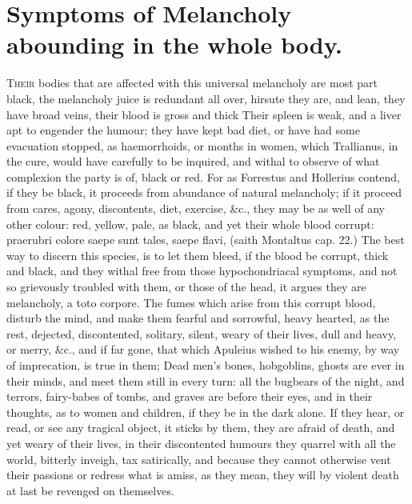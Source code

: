 {%
\section[Symptoms In the Whole Body]{Symptoms of Melancholy abounding in the whole body.}

\lettrine{T}{heir} bodies that are affected with this universal melancholy are most
part black, the melancholy juice is redundant all over, hirsute
they are, and lean, they have broad veins, their blood is gross and
thick  Their spleen is weak, and a liver apt to engender the
humour; they have kept bad diet, or have had some evacuation stopped,
as haemorrhoids, or months in women, which Trallianus, in the
cure, would have carefully to be inquired, and withal to observe of
what complexion the party is of, black or red. For as Forrestus and
Hollerius contend, if they be black, it proceeds from abundance
of natural melancholy; if it proceed from cares, agony, discontents,
diet, exercise, \&c., they may be as well of any other colour: red,
yellow, pale, as black, and yet their whole blood corrupt: praerubri
colore saepe sunt tales, saepe flavi, (saith  Montaltus cap. 22.)
The best way to discern this species, is to let them bleed, if the
blood be corrupt, thick and black, and they withal free from those
hypochondriacal symptoms, and not so grievously troubled with them, or
those of the head, it argues they are melancholy, a toto corpore. The
fumes which arise from this corrupt blood, disturb the mind, and make
them fearful and sorrowful, heavy hearted, as the rest, dejected,
discontented, solitary, silent, weary of their lives, dull and heavy,
or merry, \&c., and if far gone, that which Apuleius wished to his
enemy, by way of imprecation, is true in them; Dead men's bones,
hobgoblins, ghosts are ever in their minds, and meet them still in
every turn: all the bugbears of the night, and terrors, fairy-babes of
tombs, and graves are before their eyes, and in their thoughts, as to
women and children, if they be in the dark alone. If they hear, or
read, or see any tragical object, it sticks by them, they are afraid of
death, and yet weary of their lives, in their discontented humours they
quarrel with all the world, bitterly inveigh, tax satirically, and
because they cannot otherwise vent their passions or redress what is
amiss, as they mean, they will by violent death at last be revenged on
themselves.

}
